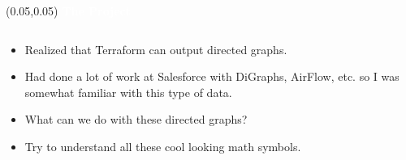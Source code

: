 \documentclass[aspectratio=169]{beamer} %
\begin{document}
\begin{frame}{}
    \setlength{\TPHorizModule}{\textwidth}
    \setlength{\TPVertModule}{\textwidth}
    \begin{textblock}{0.74}(0.05,0.05)
        \bfseries\large\textcolor{white}{The Project}
    \end{textblock}

    \begin{columns} %
        \begin{column}{0.8\textwidth}
            \begin{itemize}
                \item Realized that Terraform can output directed graphs.
                \item Had done a lot of work at Salesforce with DiGraphs, AirFlow, etc. so I was somewhat familiar with this type of data.
                \item What can we do with these directed graphs?
                \item Try to understand all these cool looking math symbols.
            \end{itemize}
        \end{column}
    \end{columns}
\end{frame}
\end{document}
